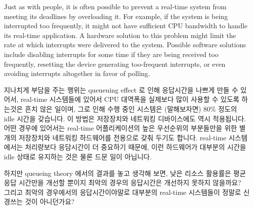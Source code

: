 Just as with people, it is often possible to prevent a real-time system
from meeting its deadlines by overloading it.
For example, if the system is being interrupted too frequently, it might
not have sufficient CPU bandwidth to handle its real-time application.
A hardware solution to this problem might limit the rate at which
interrupts were delivered to the system.
Possible software solutions include disabling interrupts for some time if
they are being received too frequently,
resetting the device generating too-frequent interrupts,
or even avoiding interrupts altogether in favor of polling.
\fi

지나치게 부담을 주는 행위는 queueuing effect 로 인해 응답시간을 나쁘게 만들 수
있어서, real-time 시스템들에 있어서 CPU 대역폭을 실제보다 많이 사용할 수 있도록
하는것은 흔치 않은 일이며, 그로 인해 수행 중인 시스템은 (말해보자면) 80\%
정도의 idle 시간을 갖습니다.
이 방법은 저장장치와 네트워킹 디바이스에도 역시 적용됩니다.
어떤 경우에 있어서는 real-time 어플리케이션의 높은 우선순위의 부분들만을 위한
별개의 저장장치와 네트워킹 하드웨어를 전용으로 갖춰 두기도 합니다.
real-time 시스템에서는 처리량보다 응담시간이 더 중요하기 때문에, 이런
하드웨어가 대부분의 시간을 idle 상태로 유지하는 것은 물론 드문 일이 아닙니다.

\QuickQuiz{}
	하지만 queueing theory 에서의 결과를 놓고 생각해 보면, 낮은 리소스
	활용률은 평균 응답 시간만을 개선할 뿐이지 최악의 경우의 응답시간은
	개선하지 못하지 않을까요?
	그리고 최악의 경우에서의 응답시간이야말로 대부분의 real-time 시스템들이
	정말로 신경쓰는 것이 아니던가요?
	\iffalse

